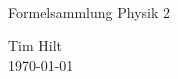 \begin{titlepage}

  \\ \vspace{3cm}
  
  \begin{center}
    {
      \Huge Formelsammlung Physik 2}
    \vspace{0.5cm}
    
    \begin{Large}
      Tim Hilt\\
      \vspace{0.4cm}
      \today\\
    \end{Large}
    
  \end{center}
\end{titlepage}
\restoregeometry

